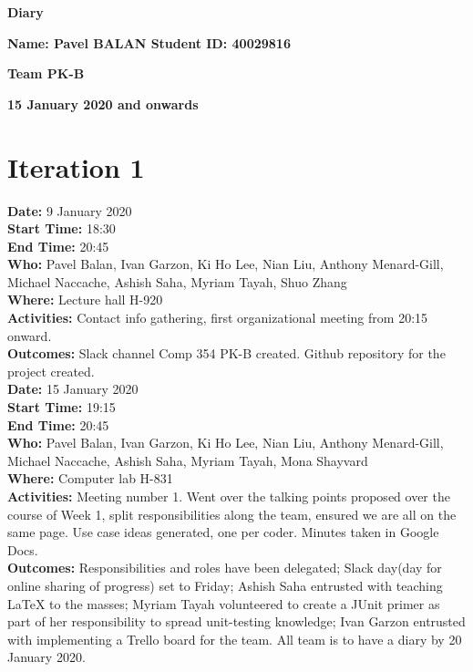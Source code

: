 \documentclass[12pt]{article}
\begin{document}
\vspace*{0.2in}
\centerline{\bf\Large Diary}

\vspace*{0.2in}
\centerline{\bf\Large Name: Pavel BALAN   Student ID: 40029816}

\vspace*{0.2in}
\centerline{\bf\Large Team PK-B}

\vspace*{0.2in}
\centerline{\bf\Large 15 January 2020 and onwards}

\section{Iteration 1}

{\bf Date:} 9 January 2020\\
{\bf Start Time:} 18:30\\
{\bf End Time:} 20:45 \\
{\bf Who:} Pavel Balan, Ivan Garzon, Ki Ho Lee, Nian Liu, Anthony Menard-Gill, Michael Naccache, Ashish Saha, Myriam Tayah, Shuo Zhang\\
{\bf Where:} Lecture hall H-920 \\
{\bf Activities:} Contact info gathering, first organizational meeting from 20:15 onward.\\
{\bf Outcomes:} Slack channel Comp 354 PK-B created. Github repository for the project created.\\

{\bf Date:} 15 January 2020\\
{\bf Start Time:} 19:15\\
{\bf End Time:} 20:45 \\
{\bf Who:} Pavel Balan, Ivan Garzon, Ki Ho Lee, Nian Liu, Anthony Menard-Gill, Michael Naccache, Ashish Saha, Myriam Tayah, Mona Shayvard\\
{\bf Where:} Computer lab H-831 \\
{\bf Activities:} Meeting number 1. Went over the talking points proposed over the course of Week 1, split responsibilities along the team, ensured we are all on the same page. Use case ideas generated, one per coder. Minutes taken in Google Docs.\\
{\bf Outcomes:} Responsibilities and roles have been delegated; Slack day(day for online sharing of progress) set to Friday; Ashish Saha entrusted with teaching LaTeX to the masses; Myriam Tayah volunteered to create a JUnit primer as part of her responsibility to spread unit-testing knowledge; Ivan Garzon entrusted with implementing a Trello board for the team. All team is to have a diary by 20 January 2020.\\
\end{document}
